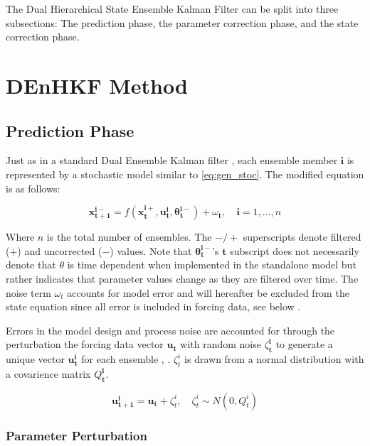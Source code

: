The Dual Hierarchical State Ensemble Kalman Filter can be split into three subsections: The prediction phase, the parameter correction phase, and the state correction phase. 

\section{DEnHKF Method}

\subsection{Prediction Phase}

Just as in a standard Dual Ensemble Kalman filter \cite{Moradkhani2005}, each ensemble member $\mathbf{i}$ is represented by a stochastic model similar to \eqref{eq:gen_stoc}. The modified equation is as follows:

\begin{equation}\label{eq:hdekf_predict}
\mathbf{x_{t+1}^{i-}} = f(\mathbf{x_{t}^{i+}}, \mathbf{u_{t}^{i}}, \mathbf{\theta^{i-}_{t}}) + \omega_{\mathbf{t}}, \quad \mathbf{i}=1,...,n
\end{equation}

Where $n$ is the total number of ensembles. The $-/+$ superscripts denote filtered ($+$) and uncorrected ($-$) values. Note that $\mathbf{\theta^{i-}_{t}}$'s $\mathbf{t}$ subscript does not necessarily denote that $\theta$ is time dependent when implemented in the standalone model but rather indicates that parameter values change as they are filtered over time. The noise term $\omega_{t}$ accounts for model error and will hereafter be excluded from the state equation since all error is included in forcing data, see below \cite{Evensen1997}.

Errors in the model design and process noise are accounted for through the perturbation the forcing data vector $\mathbf{u_{t}}$ with random noise $\zeta_{\mathbf{t}}^{\mathbf{i}}$ to generate a unique vector $\mathbf{u_{t}^{i}}$ for each ensemble \cite{Moradkhani2005}, \cite{Chen2008}. $\zeta_{t}^{i}$ is drawn from a normal distribution with a covarience matrix $Q_{\mathbf{t}}^{\mathbf{i}}$.

\begin{equation}\label{eq:hdekf_u}
\mathbf{u_{t+1}^{i}} = \mathbf{u_{t}} + \zeta_{t}^{i}, \quad \zeta_{t}^{i} \sim N(0,Q_{t}^{i}) 
\end{equation}

\subsubsection{Parameter Perturbation}

